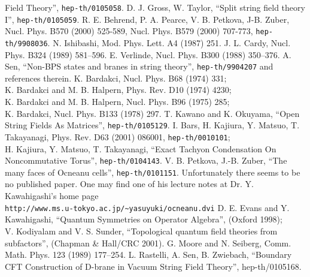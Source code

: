 \documentclass[a4paper,12pt]{article}
\begin{document}
\begin{thebibliography}{99}
Field Theory'', {\tt hep-th/0105058}.
 D. J. Gross, W. Taylor,
``Split string field theory I'', {\tt hep-th/0105059}.
 R. E. Behrend, P. A. Pearce, V. B. Petkova,
J-B. Zuber, 
Nucl. Phys. B570 (2000) 525-589, Nucl. Phys. B579 (2000) 707-773,
{\tt hep-th/9908036}.
 N. Ishibashi, Mod. Phys. Lett. A4 (1987) 251.
 J. L. Cardy, Nucl. Phys. B324 (1989) 581--596.
 E. Verlinde, Nucl. Phys. B300 (1988) 350--376.
 A. Sen, ``Non-BPS states and branes in string theory'',
{\tt hep-th/9904207} and references therein.
 K. Bardakci, Nucl. Phys. B68 (1974) 331;\\
K. Bardakci and M. B. Halpern, Phys. Rev. D10 (1974) 4230;\\
K. Bardakci and M. B. Halpern, Nucl. Phys. B96 (1975) 285;\\
K. Bardakci, Nucl. Phys. B133 (1978) 297.
 T. Kawano and K. Okuyama,
``Open String Fields As Matrices'', {\tt hep-th/0105129}.
 I. Bars, H. Kajiura, Y. Matsuo, T. Takayanagi,
Phys. Rev. D63 (2001) 086001,
{\tt hep-th/0010101};\\
H. Kajiura, Y. Matsuo, T. Takayanagi,
``Exact Tachyon Condensation On Noncommutative Torus'',
{\tt hep-th/0104143}.
 V. B. Petkova, J.-B. Zuber, 
``The many faces of Ocneanu cells'',
{\tt hep-th/0101151}.
 Unfortunately there seems to be no published paper.
One may find one of his lecture notes at Dr. Y. Kawahigashi's home page\\
{\tt http://www.ms.u-tokyo.ac.jp/\textasciitilde{}yasuyuki/ocneanu.dvi}
 D. E. Evans and Y. Kawahigashi,
``Quantum Symmetries on Operator Algebra'', (Oxford 1998);\\
V. Kodiyalam and V. S. Sunder, ``Topological quantum field
theories from subfactors'', (Chapman \& Hall/CRC 2001).
 G. Moore and N. Seiberg, 
Comm. Math. Phys. 123 (1989) 177--254.
 L. Rastelli, A. Sen, B. Zwiebach,
``Boundary CFT Construction of D-brane in Vacuum String
Field Theory'', hep-th/0105168.
\end{thebibliography}
\end{document}
